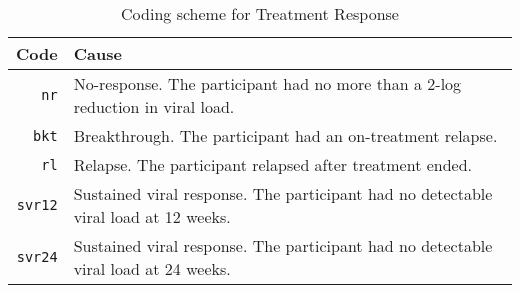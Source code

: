 \begin{table}[h]
  \caption{Coding scheme for Treatment Response}
  \label{tbl:cause-of-death}
  \begin{tabular}{rl}
    Code                & Cause \\ \hline
    \texttt{nr}         & No-response. The participant had no more than a 2-log reduction in viral load. \\
    \texttt{bkt}        & Breakthrough. The participant had an on-treatment relapse. \\
    \texttt{rl}         & Relapse. The participant relapsed after treatment ended. \\
    \texttt{svr12}      & Sustained viral response. The participant had no detectable viral load at 12 weeks. \\
    \texttt{svr24}      & Sustained viral response. The participant had no detectable viral load at 24 weeks. \\
  \end{tabular}
\end{table}
